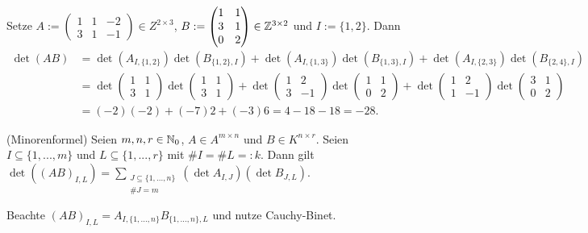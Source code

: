 \documentclass[../../main.tex]{subfiles}
\begin{document}
\begin{bsp}\label{17.2.7}
Setze $A:=\begin{pmatrix*}1&1&-2\\3&1&-1\end{pmatrix*}\in Z^{2\times 3}$, $B:=\begin{pmatrix*}1&1\\ 3&1\\ 0&2\end{pmatrix*}\in \Z^{3\times 2}$ und $I:=\{1,2\}$. Dann
\begin{align*}
\det(AB)&=\det(A_{I,\{1,2\}})\det(B_{\{1,2\},I})+\det(A_{I,\{1,3\}})\det(B_{\{1,3\},I})
+\det(A_{I,\{2,3\}})\det(B_{\{2,4\},I})\\
&=\det\begin{pmatrix*}1&1\\3&1\end{pmatrix*}\det\begin{pmatrix*}1&1\\3&1\end{pmatrix*}+\det\begin{pmatrix*}1&2\\3&-1\end{pmatrix*}\det\begin{pmatrix*}1&1\\0&2\end{pmatrix*}
+\det\begin{pmatrix*}1&2\\1&-1\end{pmatrix*}\det\begin{pmatrix*}3&1\\0&2\end{pmatrix*}\\
&=(-2)(-2)+(-7)2+(-3)6=4-18-18=-28.
\end{align*}
\end{bsp}

\begin{kor}\label{17.2.8}
(Minorenformel) Seien $m,n,r\in \mathbb N_0$, $A\in A^{m\times n}$ und $B\in K^{n\times r}$. Seien $I\subseteq\{1,...,m\}$ und $L\subseteq\{1,...,r\}$ mit $\# I=\#L=:k$. Dann gilt\\ $\det((AB)_{I,L})=\sum_{\substack{J\subseteq\{1,...,n\}\\\#J=m}}(\det A_{I,J})(\det B_{J,L})$.
\end{kor}
\begin{cproof}
Beachte $(AB)_{I,L}=A_{I,\{1,...,n\}}B_{\{1,...,n\},L}$ und nutze Cauchy-Binet.
\end{cproof}
\end{document}
